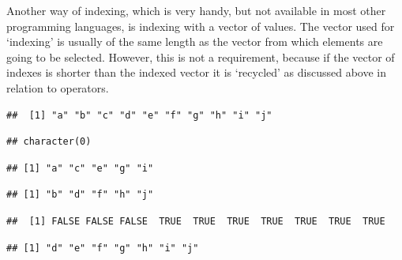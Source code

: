 \documentclass[krantz2]{krantz}\usepackage{knitr}%
\begin{document}
Another way of indexing, which is very handy, but not available in most other programming languages, is indexing with a vector of  values. The  vector used for `indexing' is usually of the same length as the vector from which elements are going to be selected. However, this is not a requirement, because if the  vector of indexes is shorter than the indexed vector it is `recycled' as discussed above in relation to operators.

\begin{knitrout}\footnotesize
{}\color{fgcolor}\begin{kframe}
\begin{alltt}
\hlstd{a[}\hlstd{]}
\end{alltt}
\begin{verbatim}
##  [1] "a" "b" "c" "d" "e" "f" "g" "h" "i" "j"
\end{verbatim}
\begin{alltt}
\hlstd{a[}\hlstd{]}
\end{alltt}
\begin{verbatim}
## character(0)
\end{verbatim}
\begin{alltt}
\hlstd{a[}\hlstd{(}\hlstd{,} \hlstd{)]}
\end{alltt}
\begin{verbatim}
## [1] "a" "c" "e" "g" "i"
\end{verbatim}
\begin{alltt}
\hlstd{a[}\hlstd{(}\hlstd{,} \hlstd{)]}
\end{alltt}
\begin{verbatim}
## [1] "b" "d" "f" "h" "j"
\end{verbatim}
\begin{alltt}
 \hlopt{>} 
\end{alltt}
\begin{verbatim}
##  [1] FALSE FALSE FALSE  TRUE  TRUE  TRUE  TRUE  TRUE  TRUE  TRUE
\end{verbatim}
\begin{alltt}
\hlstd{a[a} \hlopt{>} \hlstd{]}
\end{alltt}
\begin{verbatim}
## [1] "d" "e" "f" "g" "h" "i" "j"
\end{verbatim}
\end{kframe}
\end{knitrout}
\end{document}
